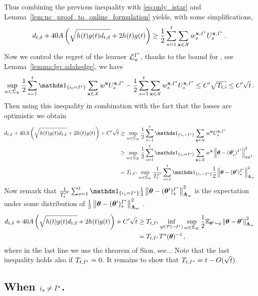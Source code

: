 Thus combining the previous inequality with \eqref{eq:only_istar} and Lemma~\ref{lem:nc_proof_to_online_formulation} yields, with some simplifications,
\begin{equation}
\label{eq:to_UCB}
d_{t,\delta} + 40 A\left(\sqrt{h(t)g(t) d_{t,\delta}}+ 2h(t)g(t)\right) \geq \frac{1}{2}\sum_{s=1}^t\sum_{{\bf x}\in\mathcal{X}} w_s^{{\bf x},I^\star}U_s^{{\bf x},I^\star}\,.
\end{equation}
Now we control the regret of the learner $\mathcal{L}_w^{I^\star}$, thanks to the bound for \AH, see Lemma~\ref{lemma:lgc.adahedge}, we have
\[
\sup_{w\in\Sigma_K}\frac{1}{2}\sum_{s=1}^t\ind_{\{i_t = \istar\}}\sum_{\bx\in\cX} w^{\bx}U_s^{\bx,\istar} -\frac{1}{2}\sum_{s=1}^t\sum_{\bx\in\cX} w_s^{\bx,\istar}U_s^{\bx,\istar} \leq C'\sqrt{T_{t,i}}\leq C'\sqrt{t}\,.
\]
Then using this inequality in combination with the fact that the losses are optimistic we obtain
\begin{align*}
  d_{t,\delta} + 40 A\left(\sqrt{h(t)g(t) d_{t,\delta}}+ 2h(t)g(t)\right) +C'\sqrt{t}
  &\geq \sup_{w\in\Sigma_K}\frac{1}{2}\sum_{s=1}^t\ind_{\{i_s = \istar\}}\sum_{\bx\in\cX} w^{\bx}U_s^{\bx,\istar}
  \\
  &\geq \sup_{w\in\Sigma_K}\frac{1}{2}\sum_{s=1}^t\ind_{\{i_s = \istar\}}\sum_{\bx\in\cX} w^{\bx} \normm{\btheta -(\btheta'_s)^{\istar}}^2_{\bx\bx\transpose}
  \\
  &= T_{t,\istar} \sup_{w\in\Sigma_K}\frac{1}{T^{i^*}_t}\sum_{s=1}^t\ind_{\{i_s = \istar\}}\frac{1}{2}\normm{\btheta -(\btheta')_s^{\istar}}^2_{\bLambda_{w}}
  \end{align*}
Now remark that $\frac{1}{T^{i^\star}_t}\sum_{s=1}^t\ind_{\{i_s = \istar\}}\frac{1}{2}\normm{\btheta -(\btheta')_s^{\istar}}^2_{\bLambda_{w}}$ is the expectation under some distribution of $\frac{1}{2}\left\lVert{\boldsymbol \theta} -({\boldsymbol \theta}')_s^{I^\star}\right\rVert^2_{{\boldsymbol \Lambda}_{w}}$ .
\begin{align*}
  d_{t,\delta} + 40 A\left(\sqrt{h(t)g(t) d_{t,\delta}}+ 2h(t)g(t)\right) +C'\sqrt{t}
  &\geq T_{t,I^\star} \inf_{q\in\mathcal{P}(\neg I^\star)} \sup_{w\in\Sigma_K}\frac{1}{2}\mathbb{E}_{{\boldsymbol \theta}'\sim q}\left\lVert{\boldsymbol \theta} -{\boldsymbol \theta}'\right\rVert^2_{{\boldsymbol \Lambda}_{w}}\\
 &=T_{t,I^\star} T^{\star}({\boldsymbol \theta})^{-1}\,,
\end{align*}
where in the last line we use the theorem of Sion, see...%
Note that the last inequality holds also if $T_{t,I^\star} = 0$. It remains to show that $T_{t,I^\star} = t- O(\sqrt{t})$.

\subsection{When $i_s \neq I^\star$.}

